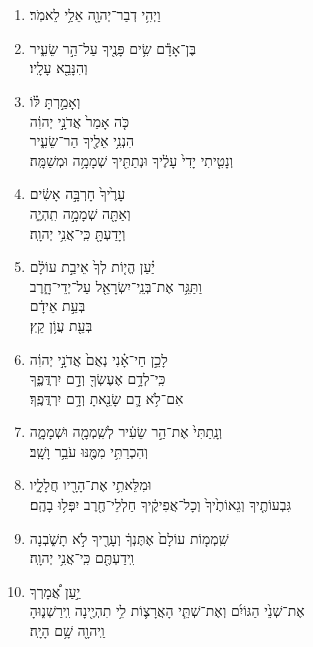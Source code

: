 \documentclass[12pt,a4paper,titlepage]{article}
\def \pslabelsep{-0.9em} %
\def \psleftmargin{0em} %
\begin{document}
\section*{}
\begin{enumerate}[leftmargin=\psleftmargin, labelsep = \pslabelsep, label={\arabic*}, font=\color{\pscolor}\small\textsuperscript, parsep=0em, itemsep=0em, topsep=0em ]
\item \texthebrew{וַיְהִ֥י דְבַר־יְהוָ֖ה אֵלַ֥י לֵאמֹֽר׃}
\item \texthebrew{בֶּן־אָדָ֕ם שִׂ֥ים פָּנֶ֖יךָ עַל־הַ֣ר שֵׂעִ֑יר \\ וְהִנָּבֵ֖א עָלָֽיו׃}
\item \texthebrew{וְאָמַ֣רְתָּ לּ֗וֹ\\  כֹּ֤ה אָמַר֙ אֲדֹנָ֣י יְהוִ֔ה \\ הִנְנִ֥י אֵלֶ֖יךָ הַר־שֵׂעִ֑יר \\ וְנָטִ֤יתִי יָדִי֙ עָלֶ֔יךָ וּנְתַתִּ֖יךָ שְׁמָמָ֥ה וּמְשַׁמָּֽה׃}
\item \texthebrew{עָרֶ֙יךָ֙ חָרְבָּ֣ה אָשִׂ֔ים \\ וְאַתָּ֖ה שְׁמָמָ֣ה תִֽהְיֶ֑ה \\ וְיָדַעְתָּ֖ כִּֽי־אֲנִ֥י יְהוָֽה׃}
\item \texthebrew{יַ֗עַן הֱי֤וֹת לְךָ֙ אֵיבַ֣ת עוֹלָ֔ם \\ וַתַּגֵּ֥ר אֶת־בְּנֵֽי־יִשְׂרָאֵ֖ל עַל־יְדֵי־חָ֑רֶב \\ בְּעֵ֣ת אֵידָ֔ם \\ בְּעֵ֖ת עֲוֹ֥ן קֵֽץ׃}
\item \texthebrew{לָכֵ֣ן חַי־אָ֗נִי נְאֻם֙ אֲדֹנָ֣י יְהוִ֔ה \\ כִּֽי־לְדָ֥ם אֶעֶשְׂךָ֖ וְדָ֣ם יִרְדֲּפֶ֑ךָ \\ אִם־לֹ֥א דָ֛ם שָׂנֵ֖אתָ וְדָ֥ם יִרְדֲּפֶֽךָ׃}
\item \texthebrew{וְנָֽתַתִּי֙ אֶת־הַ֣ר שֵׂעִ֔יר לְשִֽׁמְמָ֖ה וּשְׁמָמָ֑ה \\ וְהִכְרַתִּ֥י מִמֶּ֖נּוּ עֹבֵ֥ר וָשָֽׁב׃}
\item \texthebrew{וּמִלֵּאתִ֥י אֶת־הָרָ֖יו חֲלָלָ֑יו \\ גִּבְעוֹתֶ֤יךָ וְגֵאוֹתֶ֙יךָ֙ וְכָל־אֲפִיקֶ֔יךָ חַלְלֵי־חֶ֖רֶב יִפְּל֥וּ בָהֶֽם׃}
\item \texthebrew{שִֽׁמְמ֤וֹת עוֹלָם֙ אֶתֶּנְךָ֔ וְעָרֶ֖יךָ לֹ֣א תָשֹׁ֑בְנָה \\ וִֽידַעְתֶּ֖ם כִּֽי־אֲנִ֥י יְהוָֽה׃}
\item \texthebrew{יַ֣עַן אֲ֠מָרְךָ \\ אֶת־שְׁנֵ֙י הַגּוֹיִ֜ם וְאֶת־שְׁתֵּ֧י הָאֲרָצ֛וֹת לִ֥י תִהְיֶ֖ינָה וִֽירַשְׁנ֑וּהָ \\ וַֽיהוָ֖ה שָׁ֥ם הָיָֽה׃}

\end{enumerate}
\end{document}
